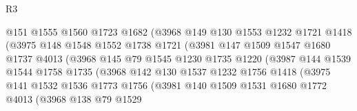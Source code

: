 \begin{lexlean}{R3}
\begin{coremodule}
                            @151
                            @1555
                            @1560
                            @1723
                            @1682
                            (@3968
                              @149
                              @130
                              @1553
                              @1232
                              @1721
                              @1418
                              (@3975
                                @148
                                @1548
                                @1552
                                @1738
                                @1721
                                (@3981
                                  @147
                                  @1509
                                  @1547
                                  @1680
                                  @1737
                                  @4013
                                  (@3968
                                    @145
                                    @79
                                    @1545
                                    @1230
                                    @1735
                                    @1220
                                    (@3987
                                      @144
                                      @1539
                                      @1544
                                      @1758
                                      @1735
                                      (@3968
                                        @142
                                        @130
                                        @1537
                                        @1232
                                        @1756
                                        @1418
                                        (@3975
                                          @141
                                          @1532
                                          @1536
                                          @1773
                                          @1756
                                          (@3981
                                            @140
                                            @1509
                                            @1531
                                            @1680
                                            @1772
                                            @4013
                                            (@3968
                                              @138
                                              @79
                                              @1529

\end{coremodule}
\end{lexlean}
